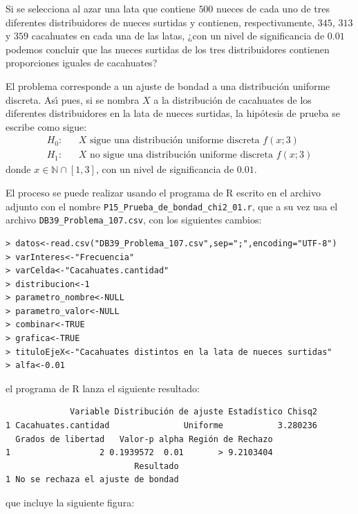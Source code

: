 \begin{enunciado}
 Si se selecciona al azar una lata que contiene $500$ nueces de cada uno de tres diferentes distribuidores de nueces surtidas y contienen, respectivamente, $345$, $313$ y $359$ cacahuates en cada una de las latas, ¿con un nivel de significancia de $0.01$ podemos concluir que las nueces surtidas de los tres distribuidores contienen proporciones iguales de cacahuates?
\end{enunciado}

\begin{solucion}
 El problema corresponde a un ajuste de bondad a una distribuci\'on
 uniforme discreta. As\'{\i} pues, si se nombra $X$ a la distribuci\'on
 de cacahuates de los diferentes distribuidores en la lata de nueces
 surtidas, la hip\'otesis de prueba se escribe como sigue:
 \begin{eqnarray*}
  H_0: & & X \text{ sigue una distribuci\'on uniforme discreta } f(x;3) \\
  H_1: & & X\text{ no sigue una distribuci\'on uniforme discreta } f(x;3)
 \end{eqnarray*}
 donde $x \in \mathbb{N}\cap[1,3]$,
 con un nivel de significancia de $0.01$.
 \par 
 El proceso se puede realizar usando el programa de R escrito
 en el archivo adjunto con el nombre
 \texttt{P15\_Prueba\_de\_bondad\_chi2\_01.r},
 que a su vez usa el archivo \texttt{DB39\_Problema\_107.csv},
 con los siguientes cambios:
 \begin{verbatim}
> datos<-read.csv("DB39_Problema_107.csv",sep=";",encoding="UTF-8")
> varInteres<-"Frecuencia"
> varCelda<-"Cacahuates.cantidad"
> distribucion<-1
> parametro_nombre<-NULL
> parametro_valor<-NULL
> combinar<-TRUE
> grafica<-TRUE
> tituloEjeX<-"Cacahuates distintos en la lata de nueces surtidas"
> alfa<-0.01
 \end{verbatim}
 \vspace{-0.5cm}
 el programa de R lanza el siguiente resultado:
 \begin{verbatim}
             Variable Distribución de ajuste Estadístico Chisq2
1 Cacahuates.cantidad               Uniforme           3.280236
  Grados de libertad   Valor-p alpha Región de Rechazo
1                  2 0.1939572  0.01       > 9.2103404
                          Resultado
1 No se rechaza el ajuste de bondad
 \end{verbatim}
 \vspace{-0.5cm}
 que incluye la siguiente figura:
 \begin{center}

\end{center}
\end{solucion}
